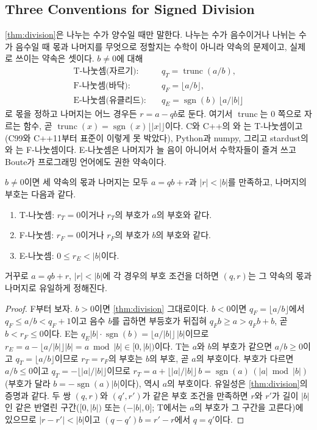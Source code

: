 \subsection{Three Conventions for Signed Division}

\cref{thm:division}은 나누는 수가 양수일 때만 말한다. 나누는 수가 음수이거나 나뉘는 수가 음수일 때 몫과 나머지를 무엇으로 정할지는 수학이 아니라 약속의 문제이고, 실제로 쓰이는 약속은 셋이다\cite{boute1992euclidean}. $b\neq0$에 대해
\begin{align*}
\text{T-나눗셈(자르기):}\quad & q_T=\operatorname{trunc}(a/b), \\
\text{F-나눗셈(바닥):}\quad & q_F=\lfloor a/b\rfloor, \\
\text{E-나눗셈(유클리드):}\quad & q_E=\operatorname{sgn}(b)\,\lfloor a/|b|\rfloor
\end{align*}
로 몫을 정하고 나머지는 어느 경우든 $r=a-qb$로 둔다. 여기서 $\operatorname{trunc}$는 $0$ 쪽으로 자르는 함수, 곧 $\operatorname{trunc}(x)=\operatorname{sgn}(x)\lfloor|x|\rfloor$이다. C와 C++의 \code{/}와 \code{\%}는 T-나눗셈이고(C99와 C++11부터 표준이 이렇게 못 박았다), Python과 numpy, 그리고 stardust의 \code{//}와 \code{\%}는 F-나눗셈이다. E-나눗셈은 나머지가 늘 음이 아니어서 수학자들이 즐겨 쓰고 Boute가 프로그래밍 언어에도 권한 약속이다.

\begin{proposition}
\label{prop:div-conventions}
$b\neq0$이면 세 약속의 몫과 나머지는 모두 $a=qb+r$과 $|r|<|b|$를 만족하고, 나머지의 부호는 다음과 같다.
\begin{enumerate}
\item T-나눗셈: $r_T=0$이거나 $r_T$의 부호가 $a$의 부호와 같다.
\item F-나눗셈: $r_F=0$이거나 $r_F$의 부호가 $b$의 부호와 같다.
\item E-나눗셈: $0\le r_E<|b|$이다.
\end{enumerate}
거꾸로 $a=qb+r$, $|r|<|b|$에 각 경우의 부호 조건을 더하면 $(q,r)$는 그 약속의 몫과 나머지로 유일하게 정해진다.
\end{proposition}

\begin{proof}
F부터 보자. $b>0$이면 \cref{thm:division} 그대로이다. $b<0$이면 $q_F=\lfloor a/b\rfloor$에서 $q_F\le a/b<q_F+1$이고 음수 $b$를 곱하면 부등호가 뒤집혀 $q_Fb\ge a>q_Fb+b$, 곧 $b<r_F\le0$이다. E는 $q_E|b|\cdot\operatorname{sgn}(b)=\lfloor a/|b|\rfloor\,|b|$이므로 $r_E=a-\lfloor a/|b|\rfloor|b|=a\bmod|b|\in[0,|b|)$이다. T는 $a$와 $b$의 부호가 같으면 $a/b\ge0$이고 $q_T=\lfloor a/b\rfloor$이므로 $r_T=r_F$의 부호는 $b$의 부호, 곧 $a$의 부호이다. 부호가 다르면 $a/b\le0$이고 $q_T=-\lfloor|a|/|b|\rfloor$이므로 $r_T=a+\lfloor|a|/|b|\rfloor\,b=\operatorname{sgn}(a)\,(|a|\bmod|b|)$(부호가 달라 $b=-\operatorname{sgn}(a)|b|$이다), 역시 $a$의 부호이다. 유일성은 \cref{thm:division}의 증명과 같다. 두 쌍 $(q,r)$와 $(q',r')$가 같은 부호 조건을 만족하면 $r$와 $r'$가 길이 $|b|$인 같은 반열린 구간($[0,|b|)$ 또는 $(-|b|,0]$; T에서는 $a$의 부호가 그 구간을 고른다)에 있으므로 $|r-r'|<|b|$이고 $(q-q')b=r'-r$에서 $q=q'$이다.
\end{proof}

